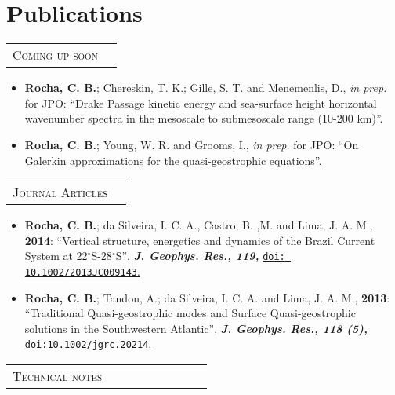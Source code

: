 \documentclass[pagestart=firstchapter]{article}
\begin{document}
\section*{Publications}

\begin{tabular}{rl}
\textsc{Coming up soon} &  \\
\end{tabular}

\begin{itemize}
    \item \textbf{Rocha, C. B.};  Chereskin, T. K.; Gille, S. T. and Menemenlis, D., {\textit{in prep.} for JPO}: ``Drake Passage kinetic energy and sea-surface height horizontal wavenumber spectra in the mesoscale to submesoscale range (10-200 km)''. 
\end{itemize}

\begin{itemize}
    \item \textbf{Rocha, C. B.};  Young, W. R. and Grooms, I., {\textit{ in prep.} for JPO}: ``On Galerkin approximations for the quasi-geostrophic equations''. 
\end{itemize}



\begin{tabular}{rl}
\hspace{-.55cm}\textsc{Journal Articles} &  \\
\end{tabular}

\begin{itemize}
    \item \textbf{Rocha, C. B.};  da Silveira, I. C. A., Castro, B. ,M. and Lima, J. A. M., \textbf{2014}: ``Vertical structure, energetics and dynamics of the Brazil Current System at 22$^\circ$S-28$^\circ$S'', \textit{\bf J. Geophys. Res., 119,} \href{http://onlinelibrary.wiley.com/doi/10.1002/2013JC009143/abstract}{\texttt{doi: 10.1002/2013JC009143}.} 

    \item \textbf{Rocha, C. B.}; Tandon, A.; da Silveira, I. C. A. and Lima, J. A. M., \textbf{2013}: ``Traditional Quasi-geostrophic modes and Surface Quasi-geostrophic solutions in the Southwestern Atlantic'', \textit{\bf J. Geophys. Res., 118 (5),} \href{http://dx.doi.org/10.1002/jgrc.20214}{\texttt{doi:10.1002/jgrc.20214}.} 
\end{itemize}

\begin{tabular}{rl}
\hspace{-.55cm}\textsc{Technical notes} ~~~~~~~~~~~~~ &  \\
\end{tabular}
\end{document}
